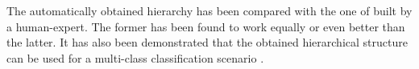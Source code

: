 \begin{itemize}
\begin{end}
The automatically obtained hierarchy has been compared with the one of built by a human-expert. The former has been found to work equally or even better than the latter. It has also been demonstrated that the obtained hierarchical structure can be used for a multi-class classification scenario \parencite{malinen2014balanced}. 








\end{end}
\end{itemize}

